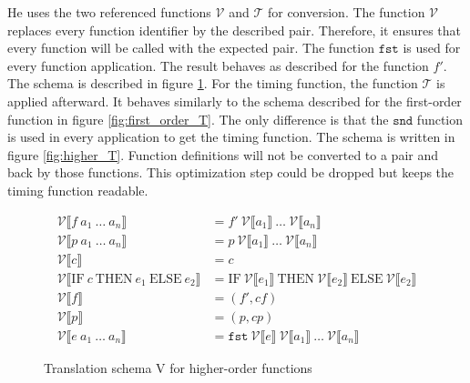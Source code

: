 He uses the two referenced functions $\mathcal{V}$ and $\mathcal{T}$ for conversion.
The function $\mathcal{V}$ replaces every function identifier by the described pair.
Therefore, it ensures that every function will be called with the expected pair.
The function $\texttt{fst}$ is used for every function application.
The result behaves as described for the function $f'$.
The schema is described in figure \ref{fig:higher_V}.
For the timing function, the function $\mathcal{T}$ is applied afterward.
It behaves similarly to the schema described for the first-order function in figure \ref{fig:first_order_T}.
The only difference is that the $\texttt{snd}$ function is used in every application to get the timing function.
The schema is written in figure \ref{fig:higher_T}.
Function definitions will not be converted to a pair and back by those functions.
This optimization step could be dropped but keeps the timing function readable.
\begin{figure}
  \begin{align*}
    \mathcal{V}\llbracket f\ a_{1}\ \dots\ a_{n}\rrbracket &= f'\ \mathcal{V}\llbracket a_{1}\rrbracket\ \dots \ \mathcal{V}\llbracket a_{n}\rrbracket\\
    \mathcal{V}\llbracket p\ a_{1}\ \dots\ a_{n}\rrbracket &= p\ \mathcal{V}\llbracket a_{1}\rrbracket\ \dots \ \mathcal{V}\llbracket a_{n}\rrbracket\\
    \mathcal{V}\llbracket c \rrbracket &= c\\
    \mathcal{V}\llbracket \text{IF}\ c\ \text{THEN}\ e_{1}\ \text{ELSE}\ e_{2}\rrbracket &= \text{IF}\  \mathcal{V}\llbracket e_{1}\rrbracket\ \text{THEN}\ \mathcal{V}\llbracket e_{2}\rrbracket\ \text{ELSE}\ \mathcal{V}\llbracket e_{2}\rrbracket\\
    \mathcal{V}\llbracket f\rrbracket &= (f',cf)\\
    \mathcal{V}\llbracket p\rrbracket &= (p,cp)\\
    \mathcal{V}\llbracket e\ a_{1}\ \dots\ a_{n}\rrbracket &= \texttt{fst}\ \mathcal{V}\llbracket e\rrbracket\ \mathcal{V}\llbracket a_{1} \rrbracket\ \dots\ \mathcal{V}\llbracket a_{n}\rrbracket
  \end{align*}
  \caption{Translation schema V for higher-order functions}
  \label{fig:higher_V}
\end{figure}
